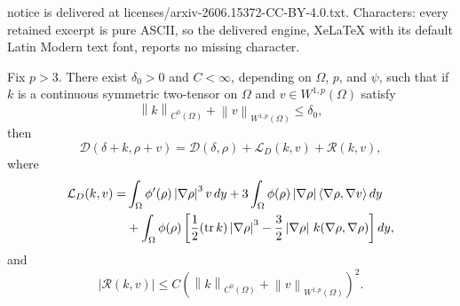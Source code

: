 \documentclass[10pt,a4paper]{amsart}
\newcommand{\Dfun}{\mathscr D}
\newcommand{\LD}{\mathcal L_D}
\newcommand{\abs}[1]{\left\lvert #1\right\rvert}
\newcommand{\ip}[2]{\langle #1,#2\rangle}
\newcommand{\norm}[1]{\left\lVert #1\right\rVert}
\newcommand{\rhoE}{\rho}
\newcommand{\tr}{\operatorname{tr}}
\begin{document}
notice is delivered at licenses/arxiv-2606.15372-CC-BY-4.0.txt. Characters: every retained excerpt is pure ASCII, so the delivered engine, XeLaTeX with its default Latin Modern text font, reports no missing character.
\begin{proposition}\label{prop:D-quadratic}
Fix $p>3$.  There exist $\delta_0>0$ and $C<\infty$, depending on $\Omega$, $p$, and $\psi$, such that if $k$ is a continuous symmetric two-tensor on $\Omega$ and $v\in W^{1,p}(\Omega)$ satisfy
$$
        \norm{k}_{C^0(\Omega)}+
        \norm{v}_{W^{1,p}(\Omega)}\le\delta_0,
$$
then
\begin{equation}\label{eq:D-quadratic}
        \Dfun(\delta+k,\rhoE+v)
        =\Dfun(\delta,\rhoE)+\LD(k,v)+\mathcal R(k,v),
\end{equation}
where
\begin{align}\label{eq:L-def}
        \LD(k,v)=
        &\int_\Omega\phi'(\rhoE)\abs{\nabla\rhoE}^3v\,dy
        +3\int_\Omega\phi(\rhoE)\abs{\nabla\rhoE}\ip{\nabla\rhoE}{\nabla v}\,dy\notag\\
        &+\int_\Omega\phi(\rhoE)
        \left[\frac12(\tr k)\abs{\nabla\rhoE}^3
        -\frac32\abs{\nabla\rhoE}\,k(\nabla\rhoE,\nabla\rhoE)\right]dy,
\end{align}
and
\begin{equation}\label{eq:D-rem-bound}
        \abs{\mathcal R(k,v)}
        \le C\left(\norm{k}_{C^0(\Omega)}+
        \norm{v}_{W^{1,p}(\Omega)}\right)^2.
\end{equation}
\end{proposition}
\end{document}
